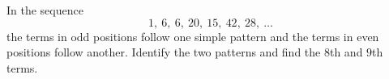 In the sequence
\[1,\ 6,\ 6,\ 20,\ 15,\ 42,\ 28,\ \dots\]
the terms in odd positions follow one simple pattern and the terms in even positions follow another. Identify the two patterns and find the $8$th and $9$th terms.
